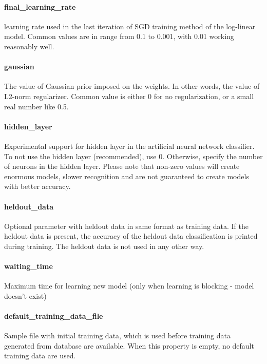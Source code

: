 \paragraph{final\_learning\_rate}
learning rate used in the last iteration of SGD training method of the log-linear
model. Common values are in range from 0.1 to 0.001, with 0.01 working reasonably well.

\paragraph{gaussian}
The value of Gaussian prior imposed on the weights. In other words, the value of
L2-norm regularizer. Common value is either 0 for no regularization, or a small
real number like 0.5.

\paragraph{hidden\_layer}
Experimental support for hidden layer in the artificial neural network classifier.
To not use the hidden layer (recommended), use 0. Otherwise, specify the number
of neurons in the hidden layer. Please note that non-zero values will create
enormous models, slower recognition and are not guaranteed to create models with
better accuracy.

\paragraph{heldout\_data}
Optional parameter with heldout data in same format as training data. If the heldout data
is present, the accuracy of the heldout data classification is printed during
training. The heldout data is not used in any other way.

\paragraph{waiting\_time}
Maximum time for learning new model (only when learning is blocking - model doesn't exist)


\paragraph{default\_training\_data\_file}
Sample file with initial training data, which is used before training data
generated from database are available. When this property is empty, no default training data
are used.

